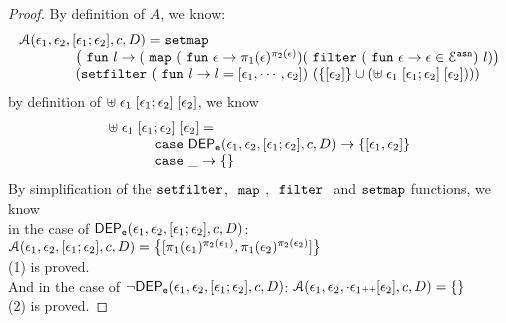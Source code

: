 \begin{proof}
By definition of $A$, we know:
%
\[
	\begin{array}{l}
	\mathcal{A}(\event_1, \event_2, [\event_1; \event_2], c, D)
	= 
	\kw{setmap} ~
	\\ \qquad \qquad
	\left(\efun l \to ( \emap 
		(\efun  \event \to \pi_1(\event)^{\pi_2(\event)})
	(\efilter 
		(\efun \event \to  \event \in \eventset^{\asn}) ~ l) \right)
	\\ \qquad \qquad
	(\kw{setfilter} ~
		(\efun l \to l = [\event_1, \cdots, \event_2]) ~ 
		\left(\left\{[\event_2]\right\} \cup \left(  {\uplus} \eapp \event_1 \eapp {[\event_1; \event_2]} \eapp [\event_2] \right) \right))
	\end{array}
\]
by definition of $ {\uplus} \; \mathtt{\epsilon}_1 \; {[\mathtt{\epsilon}_1; \mathtt{\epsilon}_2]} \; [\mathtt{\epsilon}_2]  $, we know 
\[
	\begin{array}{l}
	{\uplus} \eapp \event_1 \eapp {[\event_1; \event_2]} \eapp [\event_2] 
	=   
	\\ \quad \qquad 	
	\ecase \eventdep(\event_1, \event_2, [\event_1; \event_2], c, D)
	\to \left\{ [\event_1, \event_2] \right\}
	\\ \quad \qquad 	
	\ecase \_
	\to \left\{ \right\}
\end{array}
\]
%
By simplification of the $\mathtt{setfilter}$, $~\mathtt{map}~$, $~\mathtt{filter}~$ and $\mathtt{setmap}$ functions, we know
\\
in the case of $\mathsf{DEP_{\mathtt{e}}}(\mathtt{\epsilon}_1, \mathtt{\epsilon}_2, [\mathtt{\epsilon}_1; \mathtt{\epsilon}_2], c, D)$:
$\mathcal{A}(\event_1, \event_2, [\event_1; \event_2], c, D) = 
  \left\{[\pi_1(\event_1)^{\pi_2(\event_1)}, \pi_1(\event_2)^{\pi_2(\event_2)}] \right \}$
\\
(1) is proved.
\\
And in the case of $\neg \mathsf{DEP_{\mathtt{e}}}(\mathtt{\epsilon}_1, \mathtt{\epsilon}_2, [\mathtt{\epsilon}_1; \mathtt{\epsilon}_2], c, D)$: 
$\mathcal{A}(\event_1, \event_2, \cdot  \event_1 \tracecat [\event_2], c, D) = 
  \left\{ \right \}$
\\
(2) is proved.
\end{proof}
%
%
